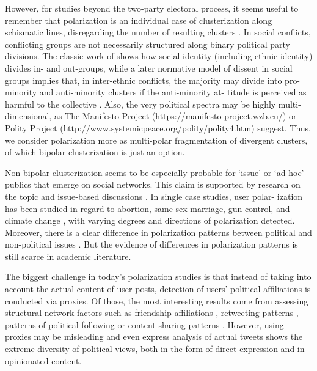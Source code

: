 However, for studies beyond the two-party electoral process, it seems useful to remember that polarization is an individual case of clusterization along schismatic lines, disregarding the number of resulting clusters \cite{EstebanRay}. In social conflicts, conflicting groups are not necessarily structured along binary political party divisions. The classic work of \cite{TajfelTurnerAustin} shows how social identity (including ethnic identity) divides in- and out-groups, while a later normative model of dissent in social groups \cite{Packer} implies that, in inter-ethnic conflicts, the majority may divide into pro- minority and anti-minority clusters if the anti-minority at- titude is perceived as harmful to the collective \cite[p.~5]{PackerChasteen}. Also, the very political spectra may be highly multi-dimensional, as The Manifesto Project (https://manifesto-project.wzb.eu/) or Polity Project (http://www.systemicpeace.org/polity/polity4.htm) suggest. Thus, we consider polarization more as multi-polar fragmentation of divergent clusters, of which bipolar clusterization is just an option.

Non-bipolar clusterization seems to be especially probable for ‘issue’ or ‘ad hoc’ publics \cite{BrunsBurgess,Papacharissi} that emerge on social networks. This claim is supported by research on the topic and issue-based discussions \cite{ElgesemSteskalDiakopoulos}. In single case studies, user polar- ization has been studied in regard to abortion, same-sex marriage, gun control, and climate change \cite{Elgesem,CalaisGuerraMeiraJrCardie,YardiBoyd}, with varying degrees and directions of polarization detected. Moreover, there is a clear difference in polarization patterns between political and non-political issues \cite{BarberaJostNagler}. But the evidence of differences in polarization patterns is still scarce in academic literature.

The biggest challenge in today’s polarization studies is that instead of taking into account the actual content of user posts, detection of users’ political affiliations is conducted via proxies. Of those, the most interesting results come from assessing structural network factors such as friendship affiliations \cite{BarberaRivero}, retweeting patterns \cite{CalaisGuerraVelosoMeiraJr}, patterns of political following \cite{BarberaJostNagler,Rivero} or content-sharing patterns \cite{AdamicGlance,BakshyMessingAdamic,ColleoniRozzaArvidsson,Elgesem}. However, using proxies may be misleading \cite{AdamicGlance} and even express analysis of actual tweets shows the extreme diversity of political views, both in the form of direct expression and in opinionated content.

